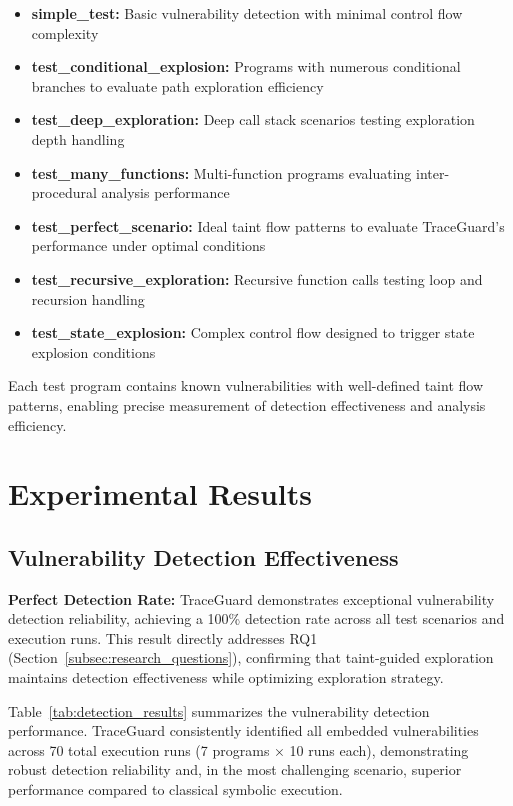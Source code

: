 \begin{itemize}
    \item \textbf{simple\_test:} Basic vulnerability detection with minimal control flow complexity
    \item \textbf{test\_conditional\_explosion:} Programs with numerous conditional branches to evaluate path exploration efficiency
    \item \textbf{test\_deep\_exploration:} Deep call stack scenarios testing exploration depth handling
    \item \textbf{test\_many\_functions:} Multi-function programs evaluating inter-procedural analysis performance
    \item \textbf{test\_perfect\_scenario:} Ideal taint flow patterns to evaluate TraceGuard's performance under optimal conditions
    \item \textbf{test\_recursive\_exploration:} Recursive function calls testing loop and recursion handling
    \item \textbf{test\_state\_explosion:} Complex control flow designed to trigger state explosion conditions
\end{itemize}

Each test program contains known vulnerabilities with well-defined taint flow patterns, enabling precise measurement of detection effectiveness and analysis efficiency.

\section{Experimental Results}

\subsection{Vulnerability Detection Effectiveness}

\textbf{Perfect Detection Rate:} TraceGuard demonstrates exceptional vulnerability detection reliability, achieving a 100\% detection rate across all test scenarios and execution runs. This result directly addresses RQ1 (Section~\ref{subsec:research_questions}), confirming that taint-guided exploration maintains detection effectiveness while optimizing exploration strategy.

Table~\ref{tab:detection_results} summarizes the vulnerability detection performance. TraceGuard consistently identified all embedded vulnerabilities across 70 total execution runs (7 programs × 10 runs each), demonstrating robust detection reliability and, in the most challenging scenario, superior performance compared to classical symbolic execution.

